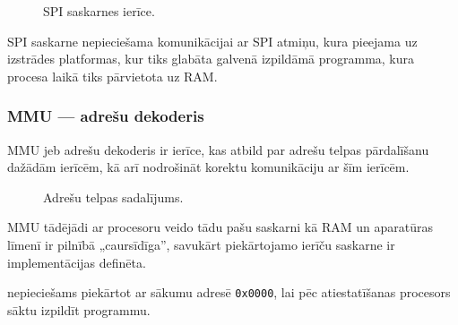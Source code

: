	\begin{figure}[thp]
		\centering
		\def\svgscale{1.25}
		{\ttfamily\scriptsize}
		\caption{SPI saskarnes ierīce.}
		\label{fig:spi}
	\end{figure}
	
	SPI saskarne nepieciešama komunikācijai ar SPI  atmiņu,
	kura pieejama uz izstrādes platformas,\cite[43.~lpp.]{FusionGuide}
	kur tiks glabāta galvenā izpildāmā programma, kura  procesa
	laikā tiks pārvietota uz RAM.

\subsubsection{MMU — adrešu dekoderis}
	MMU jeb adrešu dekoderis ir ierīce, kas atbild par adrešu telpas
	pārdalīšanu dažādām ierīcēm, kā arī nodrošināt korektu komunikāciju
	ar šīm ierīcēm.
	
	\begin{figure}[thp]
		\centering
		\def\svgwidth{0.75\textwidth}
		{\ttfamily\small}
		\caption{Adrešu telpas sadalījums.}
		\label{fig:memory-map}
	\end{figure}
	
	MMU tādējādi ar procesoru veido tādu pašu saskarni kā RAM un aparatūras
	līmenī ir pilnībā „caursīdīga”, savukārt piekārtojamo ierīču saskarne
	ir implementācijas definēta.
	
	 nepieciešams piekārtot ar sākumu adresē \texttt{0x0000},
	lai pēc atiestatīšanas procesors sāktu izpildīt  programmu.
